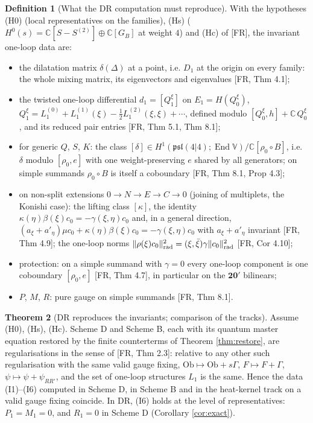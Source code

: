 \documentclass[11pt]{article}
\theoremstyle{definition}
\newtheorem{definition}{Definition}[section]
\newtheorem{theorem}[definition]{Theorem}
\numberwithin{equation}{section}
\begin{document}
\begin{definition}[What the DR computation must reproduce]
\label{def:targets}
With the hypotheses (H0) (local representatives on the families), (Hs) ($H^0(s)=\mathbb C[S-S^{(2)}]\oplus\mathbb C[G_B]$ at weight $4$) and (Hc) of [FR], the invariant one-loop data are:
\begin{itemize}
\item[(I1)] the dilatation matrix $\delta(\Delta)$ at a point, i.e. $D_1$ at the origin on every family: the whole mixing matrix, its eigenvectors and eigenvalues [FR, Thm 4.1];
\item[(I2)] the twisted one-loop differential $d_1=[Q^\xi_1]$ on $E_1=H(Q^\xi_0)$, $Q^\xi_1=L_1^{(0)}+L_1^{(1)}(\xi)-\frac12L_1^{(2)}(\xi,\xi)+\cdots$, defined modulo $[Q^\xi_0,h]+\mathbb C\,Q^\xi_0$, and its reduced pair entries [FR, Thm 5.1, Thm 8.1];
\item[(I3)] for generic $Q$, $S$, $K$: the class $[\delta]\in H^1(\mathfrak{psl}(4|4);\operatorname{End}\mathbb V)/\mathbb C[\rho_0\circ B]$, i.e. $\delta$ modulo $[\rho_0,e]$ with one weight-preserving $e$ shared by all generators; on simple summands $\rho_0\circ B$ is itself a coboundary [FR, Thm 8.1, Prop 4.3];
\item[(I4)] on non-split extensions $0\to N\to E\to C\to0$ (joining of multiplets, the Konishi case): the lifting class $[\kappa]$, the identity $\kappa(\eta)\beta(\xi)c_0=-\gamma(\xi,\eta)c_0$ and, in a general direction, $(a_\xi+a'_\eta)\mu c_0+\kappa(\eta)\beta(\xi)c_0=-\gamma(\xi,\eta)c_0$ with $a_\xi+a'_\eta$ invariant [FR, Thm 4.9]; the one-loop norms $\|\rho(\xi)c_0\|^2_{\rm rad}=(\xi,\bar\xi)\gamma\|c_0\|^2_{\rm rad}$ [FR, Cor 4.10];
\item[(I5)] protection: on a simple summand with $\gamma=0$ every one-loop component is one coboundary $[\rho_0,e]$ [FR, Thm 4.7], in particular on the $\mathbf{20}'$ bilinears;
\item[(I6)] $P$, $M$, $R$: pure gauge on simple summands [FR, Thm 8.1].
\end{itemize}
\end{definition}

\begin{theorem}[DR reproduces the invariants; comparison of the tracks]
\label{thm:inv}
Assume (H0), (Hs), (Hc). Scheme D and Scheme B, each with its quantum master equation restored by the finite counterterms of Theorem \ref{thm:restore}, are regularisations in the sense of [FR, Thm 2.3]: relative to any other such regularisation with the same valid gauge fixing, $\mathrm{Ob}\mapsto\mathrm{Ob}+s\Gamma$, $F\mapsto F+\Gamma$, $\psi\mapsto\psi+\psi_{RR'}$, and the set of one-loop structures $L_1$ is the same. Hence the data (I1)--(I6) computed in Scheme D, in Scheme B and in the heat-kernel track on a valid gauge fixing coincide. In DR, (I6) holds at the level of representatives: $P_1=M_1=0$, and $R_1=0$ in Scheme D (Corollary \ref{cor:exact}).
\end{theorem}
\end{document}
